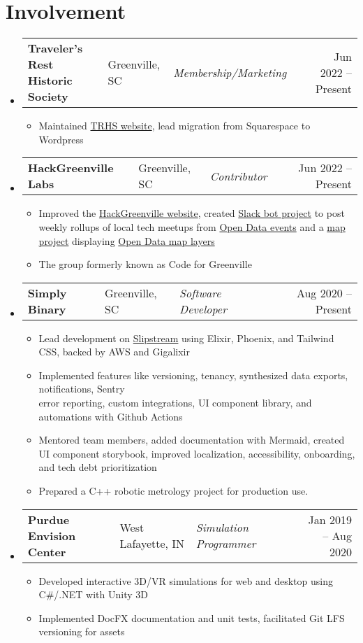 \documentclass[11pt]{extarticle}
\makeatletter
\newcommand{\entry}[5]{
	\begin{tabularx}{\linewidth}{l@{, }l@{ – }lXr}
			\textbf{#1} & #2 & \lighttext \textit{#3} & & #4 – #5
	\end{tabularx}
	\vspace{-16pt}
}
\newcommand{\sectiontitle}[1]{
	\section*{\sectiontext #1}
	\vspace{-2pt}
}
\makeatother
\begin{document}
\sectiontitle{Involvement}
\begin{itemize}[leftmargin=1em]
	\item[]
	\entry{Traveler's Rest Historic Society}{Greenville, SC}{Membership/Marketing}{Jun 2022}{Present}
	\begin{itemize}
		\item Maintained \href{https://travelersresthistoricalsociety.org}{TRHS
		website}, lead migration from Squarespace to Wordpress
	\end{itemize}

	\item[]
	\entry{HackGreenville Labs}{Greenville, SC}{Contributor}{Jun 2022}{Present}
	\begin{itemize}
		\item Improved the \href{https://hackgreenville.com/}{HackGreenville
			website}, created
			\href{https://github.com/hackgvl/slack-events-bot}{Slack bot project}
			to post weekly rollups of local tech meetups from
			\href{https://github.com/hackgvl/OpenData}{Open Data events}
			and a
			\href{https://github.com/hackgvl/open-map-data-multi-layers-demo}{map
			project} displaying
			\href{https://github.com/hackgvl/OpenData}{Open Data map layers}
		\item The group formerly known as Code for Greenville
	\end{itemize}

	\item[]
	\entry{Simply Binary}{Greenville, SC}{Software Developer}{Aug 2020}{Present}
	\begin{itemize}
		\item Lead development on \href{https://www.goslipstream.app/}{Slipstream}
		using Elixir, Phoenix, and Tailwind CSS, backed by AWS and Gigalixir
		\item Implemented features like versioning, tenancy, synthesized data
		exports, notifications, Sentry \\
		error reporting, custom integrations, UI component library, and automations
		with Github Actions
		\item Mentored team members, added documentation with Mermaid, created UI
		component storybook, improved localization, accessibility, onboarding, and
		tech debt prioritization
		\item Prepared a C++ robotic metrology project for production use.
	\end{itemize}

	\item[]
	\entry{Purdue Envision Center}{West Lafayette, IN}{Simulation Programmer}{Jan 2019}{Aug 2020}
	\begin{itemize}
		\item Developed interactive 3D/VR simulations for web and desktop using
		C\#/.NET with Unity 3D
		\item Implemented DocFX documentation and unit tests, facilitated Git LFS
		versioning for assets
	\end{itemize}


\end{itemize}
\end{document}
